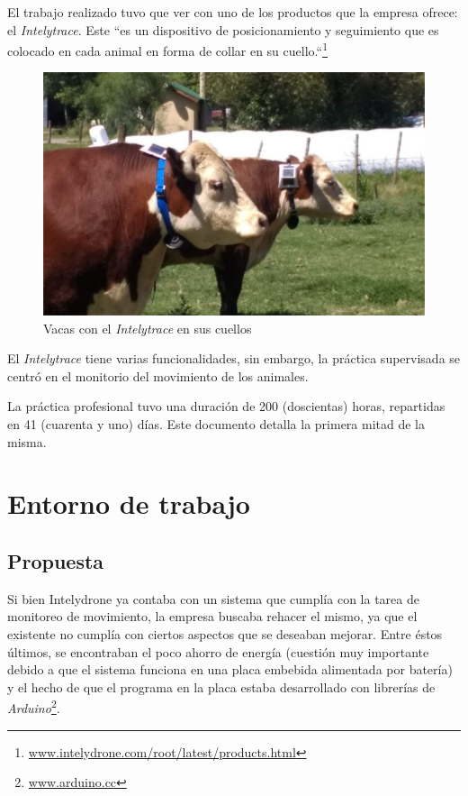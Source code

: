 \documentclass{article}
\newcommand{ \fntrace }{\footnote{\url{www.intelydrone.com/root/latest/products.html}}}
\newcommand{ \fnarduino }{\footnote{\url{www.arduino.cc}}}
\begin{document}
    El trabajo realizado tuvo que ver con uno de los productos que la empresa
    ofrece: el \emph{Intelytrace}. Este ``es un dispositivo de posicionamiento 
    y seguimiento que es colocado en cada animal en forma de collar en su 
    cuello.``\fntrace 

    \begin{figure}[h]
        \includegraphics[width=0.7 \textwidth, center]{trace.jpg}
        \caption{Vacas con el \emph{Intelytrace} en sus cuellos}
        \label{fig:trace}
    \end{figure} 

    \par
    El \emph{Intelytrace} tiene varias funcionalidades, sin embargo, la 
    práctica supervisada se centró en el monitorio del movimiento de los 
    animales. \par

    La práctica profesional tuvo una duración de 200 (doscientas) horas, 
    repartidas en 41 (cuarenta y  uno) días. Este documento detalla la primera
    mitad de la misma.

    
    \newpage
    \section{Entorno de trabajo}

    \subsection{Propuesta}
    Si bien Intelydrone ya contaba con un sistema que cumplía con la tarea 
    de monitoreo de movimiento, la empresa buscaba rehacer el mismo, ya que el
    existente no cumplía con ciertos aspectos que se deseaban mejorar. Entre 
    éstos últimos, se encontraban el poco ahorro de energía (cuestión muy 
    importante debido a que el sistema funciona en una placa embebida 
    alimentada por batería) y el hecho de que el programa en la placa estaba
    desarrollado con librerías de \emph{Arduino}\fnarduino. \par
\end{document}
